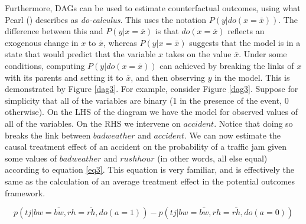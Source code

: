 \documentclass{article}
\begin{document}
Furthermore, DAGs can be used to estimate counterfactual outcomes, using what Pearl (\citeyear{pearl2014probabilistic}) describes as \textit{do-calculus}. This uses the notation $P(y|do(x=\bar{x}))$. The difference between this and $P(y|x=\bar{x})$ is that $do(x=\bar{x})$ reflects an exogenous change in $x$ to $\bar{x}$, whereas $P(y|x=\bar{x})$ suggests that the model is in a state that would predict that the variable $x$ takes on the value $\bar{x}$. Under some conditions, computing $P(y|do(x=\bar{x}))$ can achieved by breaking the links of $x$ with its parents and setting it to $\bar{x}$, and then observing $y$ in the model. This is demonstrated by Figure \ref{dag3}. For example, consider Figure \ref{dag3}. Suppose for simplicity that all of the variables are binary (1 in the presence of the event, 0 otherwise). On the LHS of the diagram we have the model for observed values of all of the variables. On the RHS we intervene on $accident$. Notice that doing so breaks the link between $bad weather$ and $accident$. We can now estimate the causal treatment effect of an accident on the probability of a traffic jam given some values of $bad weather$ and $rush hour$ (in other words, all else equal) according to equation \ref{eq3}. This equation is very familiar, and is effectively the same as the calculation of an average treatment effect in the potential outcomes framework.

\begin{equation}
  \label{eq3}
  p(tj | bw = \bar{bw}, rh = \bar{rh}, do(a=1)) - p(tj | bw = \bar{bw}, rh = \bar{rh}, do(a=0))
\end{equation}
\end{document}
